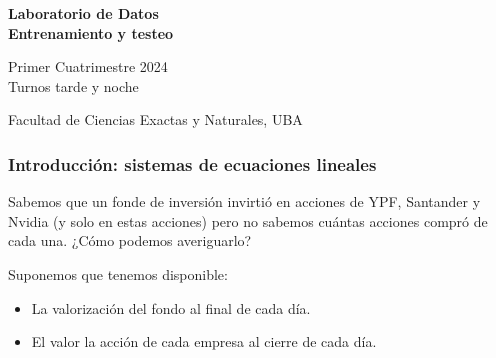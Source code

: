 \documentclass[aspectratio=169,12pt]{beamer}
\begin{document}

\begin{frame}

 \begin{center}

\Large\textbf{Laboratorio de Datos} \\
\large\textbf{Entrenamiento y testeo}




\vspace{1cm}
Primer Cuatrimestre 2024 \\ Turnos tarde y noche

\vspace{1cm}


 {\small Facultad de Ciencias Exactas y Naturales, UBA}
 \end{center}


\end{frame}


\begin{frame}
\frametitle{Introducción: sistemas de ecuaciones lineales}

Sabemos que un fonde de inversión invirtió en acciones de YPF, Santander y Nvidia (y solo en estas acciones) pero no sabemos cuántas acciones compró de cada una. ¿Cómo podemos averiguarlo?

\pause

Suponemos que tenemos disponible:
\begin{itemize}
\item La valorización del fondo al final de cada día.
\item El valor la acción de cada empresa al cierre de cada día.
\end{itemize}

\end{frame}

\end{document}
